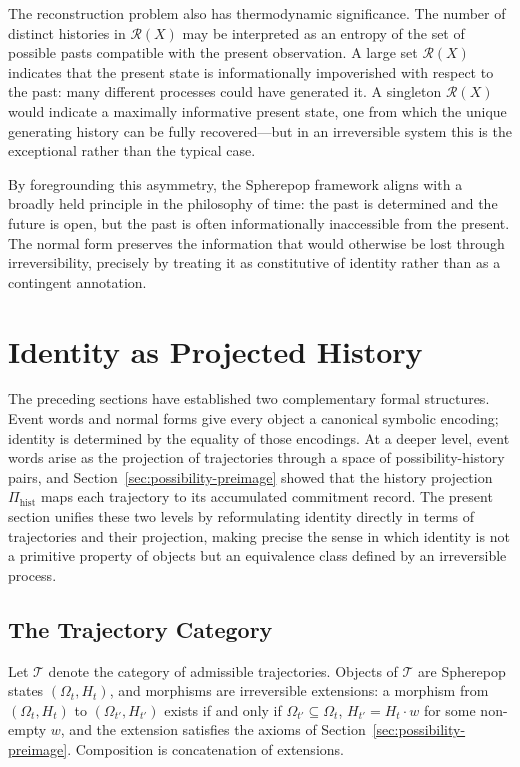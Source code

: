 \documentclass[12pt]{article}
\theoremstyle{plain}
\theoremstyle{definition}
\theoremstyle{remark}
\begin{document}
The reconstruction problem also has thermodynamic significance.  The number
of distinct histories in $\mathcal{R}(X)$ may be interpreted as an entropy
of the set of possible pasts compatible with the present observation.  A
large set $\mathcal{R}(X)$ indicates that the present state is
informationally impoverished with respect to the past: many different
processes could have generated it.  A singleton $\mathcal{R}(X)$ would
indicate a maximally informative present state, one from which the unique
generating history can be fully recovered---but in an irreversible system
this is the exceptional rather than the typical case.

By foregrounding this asymmetry, the Spherepop framework aligns with a
broadly held principle in the philosophy of time: the past is determined and
the future is open, but the past is often informationally inaccessible from
the present.  The normal form preserves the information that would otherwise
be lost through irreversibility, precisely by treating it as constitutive of
identity rather than as a contingent annotation.



\section{Identity as Projected History}
\label{sec:identity}

The preceding sections have established two complementary formal structures.
Event words and normal forms give every object a canonical symbolic encoding;
identity is determined by the equality of those encodings.  At a deeper level,
event words arise as the projection of trajectories through a space of
possibility-history pairs, and Section~\ref{sec:possibility-preimage} showed
that the history projection $\Pi_{\mathrm{hist}}$ maps each trajectory to its
accumulated commitment record.  The present section unifies these two levels
by reformulating identity directly in terms of trajectories and their
projection, making precise the sense in which identity is not a primitive
property of objects but an equivalence class defined by an irreversible process.

\subsection{The Trajectory Category}

Let $\mathcal{T}$ denote the category of admissible trajectories.  Objects of
$\mathcal{T}$ are Spherepop states $(\Omega_t, H_t)$, and morphisms are
irreversible extensions: a morphism from $(\Omega_t, H_t)$ to
$(\Omega_{t'}, H_{t'})$ exists if and only if $\Omega_{t'} \subseteq \Omega_t$,
$H_{t'} = H_t \cdot w$ for some non-empty $w$, and the extension satisfies
the axioms of Section~\ref{sec:possibility-preimage}.  Composition is
concatenation of extensions.
\end{document}
